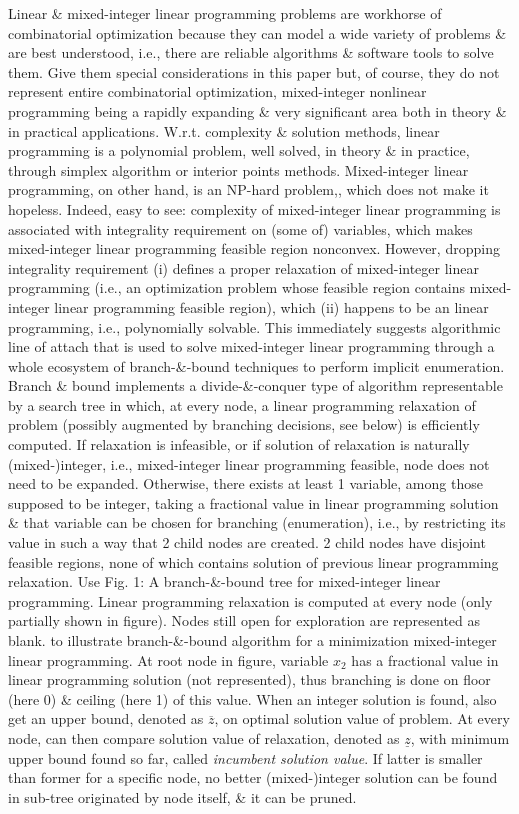 \documentclass{article}
\begin{document}
\begin{itemize}
\begin{itemize}
        Linear \& mixed-integer linear programming problems are workhorse of combinatorial optimization because they can model a wide variety of problems \& are best understood, i.e., there are reliable algorithms \& software tools to solve them. Give them special considerations in this paper but, of course, they do not represent entire combinatorial optimization, mixed-integer nonlinear programming being a rapidly expanding \& very significant area both in theory \& in practical applications. W.r.t. complexity \& solution methods, linear programming is a polynomial problem, well solved, in theory \& in practice, through simplex algorithm or interior points methods. Mixed-integer linear programming, on other hand, is an NP-hard problem,, which does not make it hopeless. Indeed, easy to see: complexity of mixed-integer linear programming is associated with integrality requirement on (some of) variables, which makes mixed-integer linear programming feasible region nonconvex. However, dropping integrality requirement (i)  defines a proper relaxation of mixed-integer linear programming (i.e., an optimization problem whose feasible region contains mixed-integer linear programming feasible region), which (ii) happens to be an linear programming, i.e., polynomially solvable. This immediately suggests algorithmic line of attach that is used to solve mixed-integer linear programming through a whole ecosystem of branch-\&-bound techniques to perform implicit enumeration. Branch \& bound implements a divide-\&-conquer type of algorithm representable by a search tree in which, at every node, a linear programming relaxation of problem (possibly augmented by branching decisions, see below) is efficiently computed. If relaxation is infeasible, or if solution of relaxation is naturally (mixed-)integer, i.e., mixed-integer linear programming feasible, node does not need to be expanded. Otherwise, there exists at least 1 variable, among those supposed to be integer, taking a fractional value in linear programming solution \& that variable can be chosen for branching (enumeration), i.e., by restricting its value in such a way that 2 child nodes are created. 2 child nodes have disjoint feasible regions, none of which contains solution of previous linear programming relaxation. Use {\sf Fig. 1: A branch-\&-bound tree for mixed-integer linear programming. Linear programming relaxation is computed at every node (only partially shown in figure). Nodes still open for exploration are represented as blank.} to illustrate branch-\&-bound algorithm for a minimization mixed-integer linear programming. At root node in figure, variable $x_2$ has a fractional value in linear programming solution (not represented), thus branching is done on floor (here 0) \& ceiling (here 1) of this value. When an integer solution is found, also get an upper bound, denoted as $\overline{z}$, on optimal solution value of problem. At every node, can then compare solution value of relaxation, denoted as $\underline{z}$, with minimum upper bound found so far, called {\it incumbent solution value}. If latter is smaller than former for a specific node, no better (mixed-)integer solution can be found in sub-tree originated by node itself, \& it can be pruned.


\end{itemize}
\end{itemize}
\end{document}
